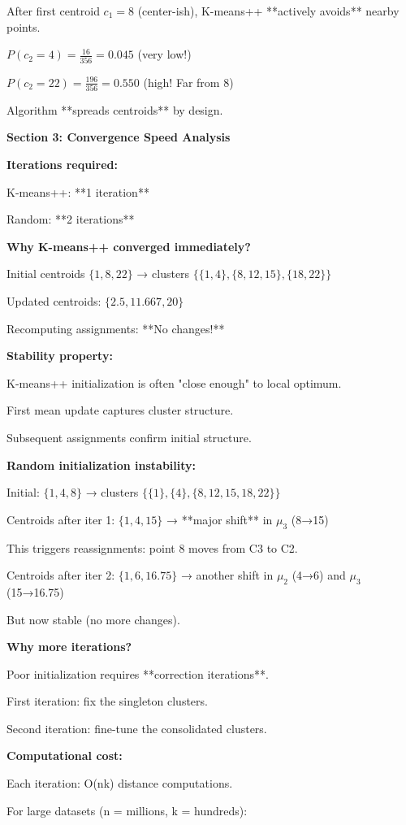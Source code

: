 \documentclass[12pt]{article}
\begin{document}
\begin{explanation}
After first centroid $c_1=8$ (center-ish), K-means++ **actively avoids** nearby points.

$P(c_2 = 4) = \frac{16}{356} = 0.045$ (very low!)

$P(c_2 = 22) = \frac{196}{356} = 0.550$ (high! Far from 8)

Algorithm **spreads centroids** by design.

\textbf{Section 3: Convergence Speed Analysis}

\textbf{Iterations required:}

K-means++: **1 iteration**

Random: **2 iterations**

\textbf{Why K-means++ converged immediately?}

Initial centroids $\{1, 8, 22\}$ → clusters $\{\{1,4\}, \{8,12,15\}, \{18,22\}\}$

Updated centroids: $\{2.5, 11.667, 20\}$

Recomputing assignments: **No changes!**

\textbf{Stability property:}

K-means++ initialization is often "close enough" to local optimum.

First mean update captures cluster structure.

Subsequent assignments confirm initial structure.

\textbf{Random initialization instability:}

Initial: $\{1, 4, 8\}$ → clusters $\{\{1\}, \{4\}, \{8,12,15,18,22\}\}$

Centroids after iter 1: $\{1, 4, 15\}$ → **major shift** in $\mu_3$ (8→15)

This triggers reassignments: point 8 moves from C3 to C2.

Centroids after iter 2: $\{1, 6, 16.75\}$ → another shift in $\mu_2$ (4→6) and $\mu_3$ (15→16.75)

But now stable (no more changes).

\textbf{Why more iterations?}

Poor initialization requires **correction iterations**.

First iteration: fix the singleton clusters.

Second iteration: fine-tune the consolidated clusters.

\textbf{Computational cost:}

Each iteration: O(nk) distance computations.

For large datasets (n = millions, k = hundreds):


\end{explanation}
\end{document}
